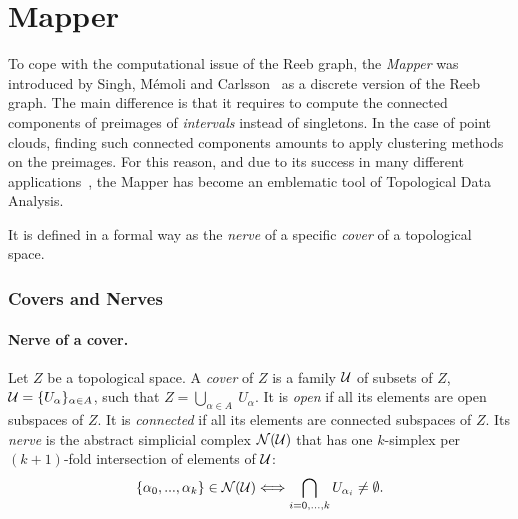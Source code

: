 \section{Mapper}
\label{sec:Mapper}



To cope with the computational issue of the Reeb graph, the {\em Mapper}
was introduced by Singh, M\'emoli and Carlsson~\cite{Singh07} as a discrete version of the Reeb graph. 
The main difference is that it requires to compute the connected components of preimages of {\em intervals} instead of singletons.
In the case of point clouds, finding such connected components amounts to apply clustering methods on the preimages.  
For this reason, and due to its success in many different applications~\cite{NBA, Barra14, Lum13, Nicolau11}, 
the Mapper has become an emblematic tool of Topological Data Analysis.

It is defined in a formal way as the {\em nerve} of a specific {\em cover} of a topological space.

\subsubsection*{Covers and Nerves}
\label{sec:basicdef}

\paragraph*{Nerve of a cover.} Let $Z$ be a topological space. A {\em cover} of $Z$ is a 
family $\mathcal{U}$ of subsets of $Z$, $\mathcal{U}=\{U_\alpha\}_{\alpha\in A}$, such
that $Z=\bigcup_{\alpha\in A}\ U_\alpha$. It is {\em open} if all its
elements are open subspaces of $Z$. It is {\em connected} if all its
elements are connected subspaces of $Z$. Its {\em nerve} is the 
abstract simplicial complex $\mathcal{N}(\mathcal{U})$ that has one $k$-simplex per 
$(k+1)$-fold intersection of elements of $\mathcal{U}$:
%
\[
\{\alpha_0,...,\alpha_k\}\in\mathcal{N}(\mathcal{U})\Longleftrightarrow\bigcap_{i=0,...,k}U_{\alpha_i}\neq\emptyset.
\]

